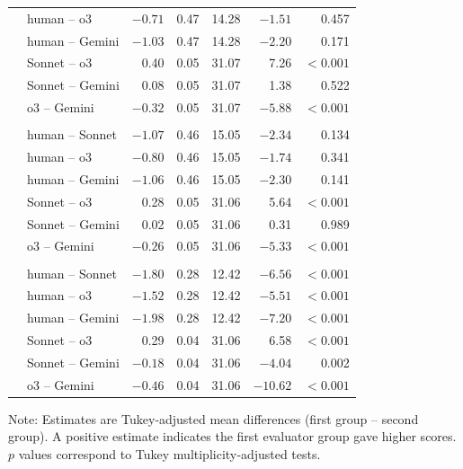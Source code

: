 \documentclass{wiley-article}
\begin{document}
\begin{table}[htbp]
\begin{threeparttable}
\begin{tabular}{l p{} r r r r r}
      & human – o3       & $-0.71$ & 0.47 & 14.28 & $-1.51$ & 0.457 \\
      & human – Gemini   & $-1.03$ & 0.47 & 14.28 & $-2.20$ & 0.171 \\
      & Sonnet – o3      &  0.40   & 0.05 & 31.07 &  7.26   & $<\!0.001$ \\
      & Sonnet – Gemini  &  0.08   & 0.05 & 31.07 &  1.38   & 0.522 \\
      & o3 – Gemini      & $-0.32$ & 0.05 & 31.07 & $-5.88$ & $<\!0.001$ \\
      \addlinespace
      \multicolumn{7}{l}{\textbf{EMP}}\\
      & human – Sonnet   & $-1.07$ & 0.46 & 15.05 & $-2.34$ & 0.134 \\
      & human – o3       & $-0.80$ & 0.46 & 15.05 & $-1.74$ & 0.341 \\
      & human – Gemini   & $-1.06$ & 0.46 & 15.05 & $-2.30$ & 0.141 \\
      & Sonnet – o3      &  0.28   & 0.05 & 31.06 &  5.64   & $<\!0.001$ \\
      & Sonnet – Gemini  &  0.02   & 0.05 & 31.06 &  0.31   & 0.989 \\
      & o3 – Gemini      & $-0.26$ & 0.05 & 31.06 & $-5.33$ & $<\!0.001$ \\
      \addlinespace
      \multicolumn{7}{l}{\textbf{OVR}}\\
      & human – Sonnet   & $-1.80$ & 0.28 & 12.42 & $-6.56$ & $<\!0.001$ \\
      & human – o3       & $-1.52$ & 0.28 & 12.42 & $-5.51$ & $<\!0.001$ \\
      & human – Gemini   & $-1.98$ & 0.28 & 12.42 & $-7.20$ & $<\!0.001$ \\
      & Sonnet – o3      &  0.29   & 0.04 & 31.06 &  6.58   & $<\!0.001$ \\
      & Sonnet – Gemini  & $-0.18$ & 0.04 & 31.06 & $-4.04$ & 0.002 \\
      & o3 – Gemini      & $-0.46$ & 0.04 & 31.06 & $-10.62$& $<\!0.001$ \\
      \bottomrule
    \end{tabular}
    \begin{tablenotes}
      \scriptsize
      \item Note: Estimates are Tukey‐adjusted mean differences (first group – second group). A positive estimate indicates the first evaluator group gave higher scores. $p$ values correspond to Tukey multiplicity‐adjusted tests.
    \end{tablenotes}
  \end{threeparttable}
\end{table}
\end{document}
